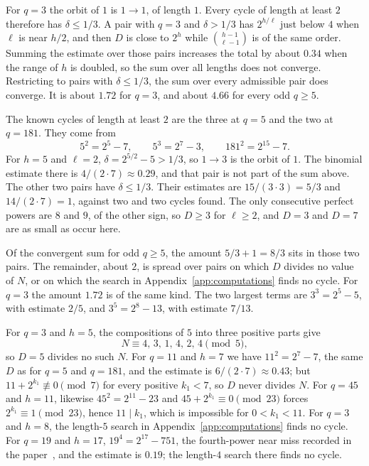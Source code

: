 \documentclass[11pt]{article}
\begin{document}
For $q = 3$ the orbit of $1$ is $1 \to 1$, of length $1$.
Every cycle of length at least $2$ therefore has $\delta \le 1/3$.
A pair with $q = 3$ and $\delta > 1/3$ has $2^{h/\ell}$ just below $4$ when $\ell$ is near $h/2$, and then $D$ is close to $2^h$ while $\binom{h-1}{\ell-1}$ is of the same order.
Summing the estimate over those pairs increases the total by about $0.34$ when the range of $h$ is doubled, so the sum over all lengths does not converge.
Restricting to pairs with $\delta \le 1/3$, the sum over every admissible pair does converge.
It is about $1.72$ for $q = 3$, and about $4.66$ for every odd $q \ge 5$.

The known cycles of length at least $2$ are the three at $q = 5$ and the two at $q = 181$.
They come from
\[
5^2 = 2^5 - 7, \qquad 5^3 = 2^7 - 3, \qquad 181^2 = 2^{15} - 7.
\]
For $h = 5$ and $\ell = 2$, $\delta = 2^{5/2} - 5 > 1/3$, so $1 \to 3$ is the orbit of $1$.
The binomial estimate there is $4/(2\cdot 7) \approx 0.29$, and that pair is not part of the sum above.
The other two pairs have $\delta \le 1/3$.
Their estimates are $15/(3\cdot 3) = 5/3$ and $14/(2\cdot 7) = 1$, against two and two cycles found.
The only consecutive perfect powers are $8$ and $9$, of the other sign, so $D \ge 3$ for $\ell \ge 2$, and $D = 3$ and $D = 7$ are as small as occur here.

Of the convergent sum for odd $q \ge 5$, the amount $5/3 + 1 = 8/3$ sits in those two pairs.
The remainder, about $2$, is spread over pairs on which $D$ divides no value of $N$, or on which the search in Appendix~\ref{app:computations} finds no cycle.
For $q = 3$ the amount $1.72$ is of the same kind.
The two largest terms are $3^3 = 2^5 - 5$, with estimate $2/5$, and $3^5 = 2^8 - 13$, with estimate $7/13$.

For $q = 3$ and $h = 5$, the compositions of $5$ into three positive parts give
\[
N \equiv 4,\, 3,\, 1,\, 4,\, 2,\, 4 \pmod{5},
\]
so $D = 5$ divides no such $N$.
For $q = 11$ and $h = 7$ we have $11^2 = 2^7 - 7$, the same $D$ as for $q = 5$ and $q = 181$, and the estimate is $6/(2\cdot 7) \approx 0.43$; but $11 + 2^{k_1} \not\equiv 0 \pmod{7}$ for every positive $k_1 < 7$, so $D$ never divides $N$.
For $q = 45$ and $h = 11$, likewise $45^2 = 2^{11} - 23$ and $45 + 2^{k_1} \equiv 0 \pmod{23}$ forces $2^{k_1} \equiv 1 \pmod{23}$, hence $11 \mid k_1$, which is impossible for $0 < k_1 < 11$.
For $q = 3$ and $h = 8$, the length-$5$ search in Appendix~\ref{app:computations} finds no cycle.
For $q = 19$ and $h = 17$, $19^4 = 2^{17} - 751$, the fourth-power near miss recorded in the paper~\cite{hackman-i}, and the estimate is $0.19$; the length-$4$ search there finds no cycle.
\end{document}
